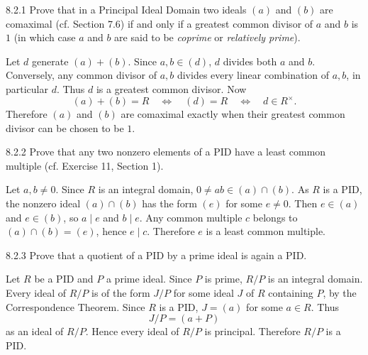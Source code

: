 \documentclass[11pt,oneside]{article}
\begin{document}
\begin{exercise}{8.2.1}
Prove that in a Principal Ideal Domain two ideals $(a)$ and $(b)$ are comaximal (cf. Section 7.6) if and only if a greatest common divisor of $a$ and $b$ is $1$ (in which case $a$ and $b$ are said to be \emph{coprime} or \emph{relatively prime}).
\end{exercise}
\begin{solution}
Let $d$ generate $(a)+(b)$. Since $a,b\in(d)$, $d$ divides both $a$ and $b$. Conversely, any common divisor of $a,b$ divides every linear combination of $a,b$, in particular $d$. Thus $d$ is a greatest common divisor. Now
\[
(a)+(b)=R\quad\Longleftrightarrow\quad(d)=R
\quad\Longleftrightarrow\quad d\in R^\times.
\]
Therefore $(a)$ and $(b)$ are comaximal exactly when their greatest common divisor can be chosen to be $1$.
\end{solution}

\begin{exercise}{8.2.2}
Prove that any two nonzero elements of a PID have a least common multiple (cf. Exercise 11, Section 1).
\end{exercise}
\begin{solution}
Let $a,b\neq0$. Since $R$ is an integral domain, $0\neq ab\in(a)\cap(b)$. As $R$ is a PID, the nonzero ideal $(a)\cap(b)$ has the form $(e)$ for some $e\neq0$. Then $e\in(a)$ and $e\in(b)$, so $a\mid e$ and $b\mid e$. Any common multiple $c$ belongs to $(a)\cap(b)=(e)$, hence $e\mid c$. Therefore $e$ is a least common multiple.
\end{solution}

\begin{exercise}{8.2.3}
Prove that a quotient of a PID by a prime ideal is again a PID.
\end{exercise}
\begin{solution}
Let $R$ be a PID and $P$ a prime ideal. Since $P$ is prime, $R/P$ is an integral domain. Every ideal of $R/P$ is of the form $J/P$ for some ideal $J$ of $R$ containing $P$, by the Correspondence Theorem. Since $R$ is a PID, $J=(a)$ for some $a\in R$. Thus
\[
J/P=(a+P)
\]
as an ideal of $R/P$. Hence every ideal of $R/P$ is principal. Therefore $R/P$ is a PID.
\end{solution}
\end{document}
